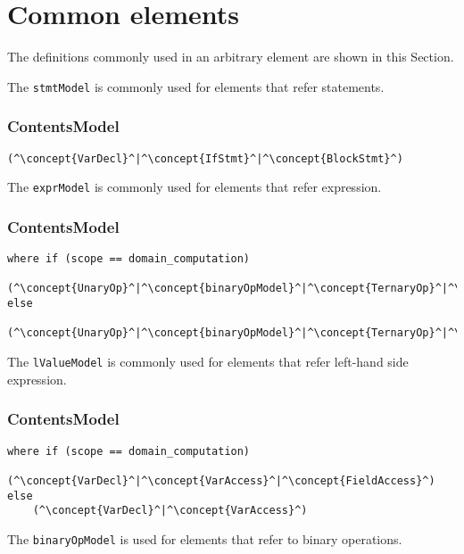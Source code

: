 \section{Common elements}
The definitions commonly used in an arbitrary element are shown in this Section.

The {\tt stmtModel} is commonly used for elements that refer statements.

\subsubsection*{ContentsModel}{}

\begin{lstlisting}[style=default,frame=none]
(^\concept{VarDecl}^|^\concept{IfStmt}^|^\concept{BlockStmt}^)
\end{lstlisting}


The {\tt exprModel} is commonly used for elements that refer expression.

\subsubsection*{ContentsModel}{}

\begin{lstlisting}[style=default,frame=none]
where if (scope == domain_computation)    
    (^\concept{UnaryOp}^|^\concept{binaryOpModel}^|^\concept{TernaryOp}^|^\concept{Literal}^|^\concept{FieldAccess}^|^\concept{VarAccess}^|^\concept{FctCall}^)
else
    (^\concept{UnaryOp}^|^\concept{binaryOpModel}^|^\concept{TernaryOp}^|^\concept{VarAccess}^|^\concept{Literal}^|^\concept{FctCall}^)
\end{lstlisting}


The {\tt lValueModel} is commonly used for elements that refer left-hand side
expression.

\subsubsection*{ContentsModel}{}

\begin{lstlisting}[style=default,frame=none]
where if (scope == domain_computation)    
    (^\concept{VarDecl}^|^\concept{VarAccess}^|^\concept{FieldAccess}^)
else
    (^\concept{VarDecl}^|^\concept{VarAccess}^)
\end{lstlisting}


The {\tt binaryOpModel} is used for elements that refer to binary operations.


